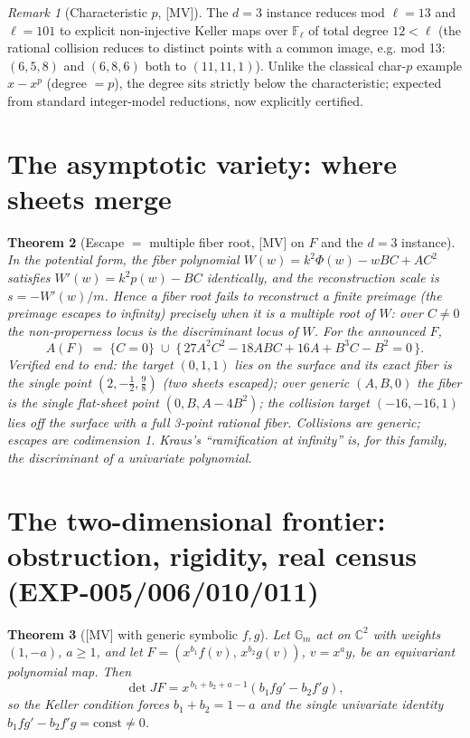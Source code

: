 \documentclass[11pt]{article}
\newtheorem{theorem}{Theorem}[section]
\theoremstyle{definition}
\theoremstyle{remark}
\newtheorem{remark}[theorem]{Remark}
\newcommand{\C}{\mathbb{C}}
\newcommand{\Gm}{\mathbb{G}_m}
\newcommand{\detJ}{\det JF}
\begin{document}
\begin{remark}[Characteristic $p$, {[MV]}]
The $d = 3$ instance reduces mod $\ell = 13$ and $\ell = 101$ to explicit non-injective Keller
maps over $\mathbb{F}_\ell$ of total degree $12 < \ell$ (the rational collision reduces to
distinct points with a common image, e.g. mod 13: $(6,5,8)$ and $(6,8,6)$ both to $(11,11,1)$).
Unlike the classical char-$p$ example $x - x^p$ (degree $= p$), the degree sits strictly below
the characteristic; expected from standard integer-model reductions, now explicitly certified.
\end{remark}

\section{The asymptotic variety: where sheets merge}

\begin{theorem}[Escape $=$ multiple fiber root, {[MV]} on $F$ and the $d=3$ instance]
\label{thm:asymptotic}
In the potential form, the fiber polynomial $W(w) = k^2\Phi(w) - wBC + AC^2$ satisfies
$W'(w) = k^2 p(w) - BC$ identically, and the reconstruction scale is $s = -W'(w)/m$. Hence a
fiber root fails to reconstruct a finite preimage (the preimage escapes to infinity) precisely
when it is a \emph{multiple} root of $W$: over $C \ne 0$ the non-properness locus is the
discriminant locus of $W$. For the announced $F$,
\[
A(F) \;=\; \{C = 0\} \;\cup\; \{\, 27 A^2 C^2 - 18 A B C + 16 A + B^3 C - B^2 = 0 \,\}.
\]
Verified end to end: the target $(0, 1, 1)$ lies on the surface and its exact fiber is the
single point $(2, -\tfrac12, \tfrac98)$ (two sheets escaped); over generic $(A, B, 0)$ the
fiber is the single flat-sheet point $(0, B, A - 4B^2)$; the collision target $(-16, -16, 1)$
lies off the surface with a full 3-point rational fiber. Collisions are generic; escapes are
codimension 1. Kraus's ``ramification at infinity'' is, for this family, the discriminant of a
univariate polynomial.
\end{theorem}

\section{The two-dimensional frontier: obstruction, rigidity, real census (EXP-005/006/010/011)}

\begin{theorem}[{[MV]} with generic symbolic $f, g$]\label{thm:2d}
Let $\Gm$ act on $\C^2$ with weights $(1, -a)$, $a \ge 1$, and let $F = (x^{b_1} f(v),\,
x^{b_2} g(v))$, $v = x^a y$, be an equivariant polynomial map. Then
\[
\detJ = x^{\,b_1 + b_2 + a - 1}\left(b_1 f g' - b_2 f' g\right),
\]
so the Keller condition forces $b_1 + b_2 = 1 - a$ and the single univariate identity
$b_1 f g' - b_2 f' g = \mathrm{const} \ne 0$.
\end{theorem}
\end{document}
